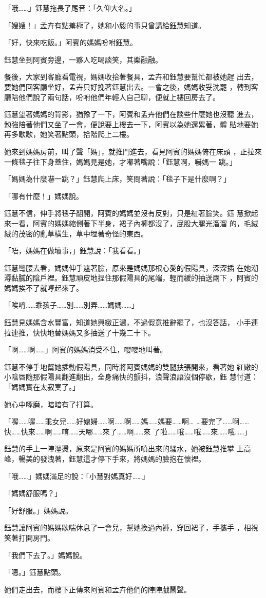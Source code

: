 「哦……」鈺慧拖長了尾音：「久仰大名。」

「嫂嫂！」孟卉有點羞極了，她和小毅的事只曾講給鈺慧知道。

「好，快來吃飯。」阿賓的媽媽吩咐鈺慧。

鈺慧坐到阿賓旁邊，一夥人吃喝談笑，其樂融融。

餐後，大家到客廳看電視，媽媽收拾著餐具，孟卉和鈺慧要幫忙都被她趕
出去，要她們回客廳坐好，孟卉只好挽著鈺慧出去。一會之後，媽媽收妥洗罷
，轉到客廳陪他們說了兩句話，吩咐他們年輕人自己聊，便就上樓回房去了。

鈺慧望著媽媽的背影，猶豫了一下，阿賓和孟卉他們在談些什麼她也沒聽
進去，勉強陪著他們又坐了一會，便說要上樓去一下，阿賓以為她還累著，體
貼地要她再多歇歇，她笑著點頭，拾階爬上二樓。

她來到媽媽房前，叫了聲「媽」，就推門進去，看見阿賓的媽媽倚在床頭
，正拉來一條毯子往下身蓋住，媽媽見是她，才嘟著嘴說：「鈺慧啊，嚇媽一
跳。」

「媽媽為什麼嚇一跳？」鈺慧爬上床，笑問著說：「毯子下是什麼啊？」

「哪有什麼！」媽媽說。

鈺慧不信，伸手將毯子翻開，阿賓的媽媽並沒有反對，只是紅著臉笑。鈺
慧掀起來一看，阿賓的媽媽縮側著下半身，裙子內褲都沒了，屁股大腿光溜溜
的，毛絨絨的茂密的亂草橫生，草中埋著奇怪的東西。

「唔，媽媽在做壞事，」鈺慧說：「我看看。」

鈺慧彎腰去看，媽媽伸手遮著臉，原來是媽媽那根心愛的假陽具，深深插
在她潮溽黏膩的陰戶裡。鈺慧頑皮地捏住那假陽具的尾端，輕而緩的抽送兩下
，阿賓的媽媽挨不了就哼起來了。

「唉唷……乖孩子……別……別弄……媽媽……」

鈺慧見媽媽含水豐富，知道她興緻正濃，不過假意推辭罷了，也沒答話，
小手連拉連推，快快地替媽媽又多抽送了十幾二十下。

「啊……啊……」阿賓的媽媽消受不住，嚶嚶地叫著。

鈺慧不停手地幫她插動假陽具，同時將阿賓媽媽的雙腿扶張開來，看著她
紅嫩的小陰唇隨那假陽具翻進翻出，全身痛快的顫抖，浪聲浪語沒個停歇，鈺
慧忖道：「媽媽實在太寂寞了。」

她心中啄磨，暗暗有了打算。

「喔……喔……乖女兒……好媳婦……啊……啊……媽……媽要……啊…
…要完了……啊……快……快來……啊……唷……天哪……來了……啊……來
了啦……哦……哦……來……哦……」

鈺慧的手上一陣溼燙，原來是阿賓的媽媽所噴出來的騷水，她被鈺慧推攀
上高峰，暢美的發洩著，鈺慧這才停下手來，將媽媽的臉抱在懷裡。

「哦……」媽媽滿足的說：「小慧對媽真好……」

「媽媽舒服嗎？」

「好舒服。」媽媽說。

鈺慧讓阿賓的媽媽歇喘休息了一會兒，幫她換過內褲，穿回裙子，手攜手
，相視笑著打開房門。

「我們下去了。」媽媽說。

「嗯。」鈺慧點頭。

她們走出去，而樓下正傳來阿賓和孟卉他們的陣陣戲鬧聲。










